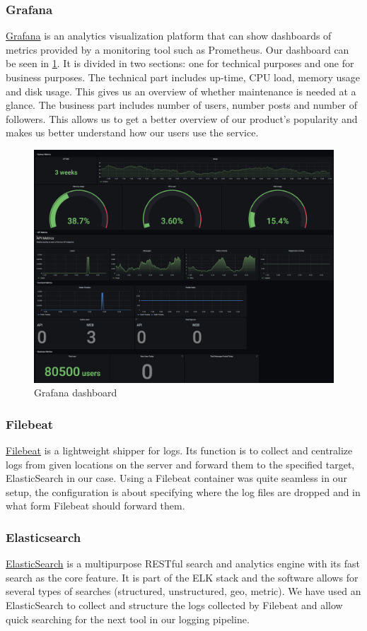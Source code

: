 \documentclass[12pt]{article}
\begin{document}
\subsubsection{Grafana}
\href{https://grafana.com/}{Grafana} is an analytics visualization platform that can show dashboards of metrics provided by a monitoring tool such as Prometheus. Our dashboard  can be seen in \ref{fig:dash}. It is divided in two sections: one for technical purposes and one for business purposes. The technical part includes up-time, CPU load, memory usage and disk usage. This gives us an overview of whether maintenance is needed at a glance. The business part includes number of users, number posts and number of followers. This allows us to get a better overview of our product's popularity and makes us better understand how our users use the service.
\begin{figure}[h!]
    \centering
    \includegraphics[width=12cm]{figures/Dash.png}
    \caption{Grafana dashboard}
    \label{fig:dash}
\end{figure}
\subsubsection{Filebeat}
\href{https://www.elastic.co/beats/filebeat}{Filebeat} is a lightweight shipper for logs. Its function is to collect and centralize logs from given locations on the server and forward them to the specified target, ElasticSearch in our case. Using a Filebeat container was quite seamless in our setup, the configuration is about specifying where the log files are dropped and in what form Filebeat should forward them. 

\subsubsection{Elasticsearch}
\href{https://www.elastic.co/elasticsearch/}{ElasticSearch} is a multipurpose RESTful search and analytics engine with its fast search as the core feature. It is part of the ELK stack and the software allows for several types of searches (structured, unstructured, geo, metric). We have used an ElasticSearch to collect and structure the logs collected by Filebeat and allow quick searching for the next tool in our logging pipeline.
\end{document}
